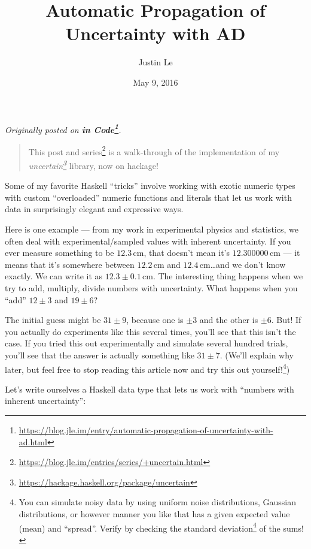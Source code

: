 \documentclass[]{article}
\title{Automatic Propagation of Uncertainty with AD}
\author{Justin Le}
\date{May 9, 2016}
\renewcommand{\href}[2]{#2\footnote{\url{#1}}}
\begin{document}
\maketitle

\emph{Originally posted on
\textbf{\href{https://blog.jle.im/entry/automatic-propagation-of-uncertainty-with-ad.html}{in
Code}}.}

\begin{quote}
This post and \href{https://blog.jle.im/entries/series/+uncertain.html}{series}
is a walk-through of the implementation of my
\emph{\href{https://hackage.haskell.org/package/uncertain}{uncertain}} library,
now on hackage!
\end{quote}

Some of my favorite Haskell ``tricks'' involve working with exotic numeric types
with custom ``overloaded'' numeric functions and literals that let us work with
data in surprisingly elegant and expressive ways.

Here is one example --- from my work in experimental physics and statistics, we
often deal with experimental/sampled values with inherent uncertainty. If you
ever measure something to be \(12.3\,\mathrm{cm}\), that doesn't mean it's
\(12.300000\,\mathrm{cm}\) --- it means that it's somewhere between
\(12.2\,\mathrm{cm}\) and \(12.4\,\mathrm{cm}\)\ldots{}and we don't know
exactly. We can write it as \(12.3 \pm 0.1\,\mathrm{cm}\). The interesting thing
happens when we try to add, multiply, divide numbers with uncertainty. What
happens when you ``add'' \(12 \pm 3\) and \(19 \pm 6\)?

The initial guess might be \(31 \pm 9\), because one is \(\pm 3\) and the other
is \(\pm 6\). But! If you actually do experiments like this several times,
you'll see that this isn't the case. If you tried this out experimentally and
simulate several hundred trials, you'll see that the answer is actually
something like \(31 \pm 7\). (We'll explain why later, but feel free to stop
reading this article now and try this out yourself!\footnote{You can simulate
  noisy data by using uniform noise distributions, Gaussian distributions, or
  however manner you like that has a given expected value (mean) and ``spread''.
  Verify by checking the
  \href{https://en.wikipedia.org/wiki/Standard_deviation}{standard deviation} of
  the sums!})

Let's write ourselves a Haskell data type that lets us work with ``numbers with
inherent uncertainty'':
\end{document}

